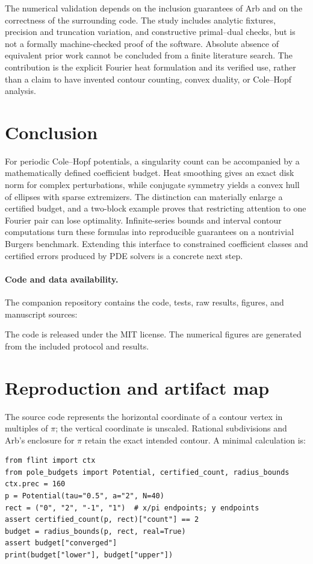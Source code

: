 \documentclass[11pt]{article}
\begin{document}
The numerical validation depends on the inclusion guarantees of Arb and on the correctness of the surrounding code. The study includes analytic fixtures, precision and truncation variation, and constructive primal--dual checks, but is not a formally machine-checked proof of the software. Absolute absence of equivalent prior work cannot be concluded from a finite literature search. The contribution is the explicit Fourier heat formulation and its verified use, rather than a claim to have invented contour counting, convex duality, or Cole--Hopf analysis.

\section{Conclusion}
For periodic Cole--Hopf potentials, a singularity count can be accompanied by a mathematically defined coefficient budget. Heat smoothing gives an exact disk norm for complex perturbations, while conjugate symmetry yields a convex hull of ellipses with sparse extremizers. The distinction can materially enlarge a certified budget, and a two-block example proves that restricting attention to one Fourier pair can lose optimality. Infinite-series bounds and interval contour computations turn these formulas into reproducible guarantees on a nontrivial Burgers benchmark. Extending this interface to constrained coefficient classes and certified errors produced by PDE solvers is a concrete next step.

\paragraph{Code and data availability.}
The companion repository contains the code, tests, raw results, figures, and manuscript sources:\par\smallskip
{}\par\smallskip
The code is released under the MIT license. The numerical figures are generated from the included protocol and results.

\appendix
\section{Reproduction and artifact map}
The source code represents the horizontal coordinate of a contour vertex in multiples of $\pi$; the vertical coordinate is unscaled. Rational subdivisions and Arb's enclosure for $\pi$ retain the exact intended contour. A minimal calculation is:
\begin{lstlisting}[basicstyle=\ttfamily\small,breaklines=true,frame=single]
from flint import ctx
from pole_budgets import Potential, certified_count, radius_bounds
ctx.prec = 160
p = Potential(tau="0.5", a="2", N=40)
rect = ("0", "2", "-1", "1")  # x/pi endpoints; y endpoints
assert certified_count(p, rect)["count"] == 2
budget = radius_bounds(p, rect, real=True)
assert budget["converged"]
print(budget["lower"], budget["upper"])
\end{lstlisting}
\end{document}
